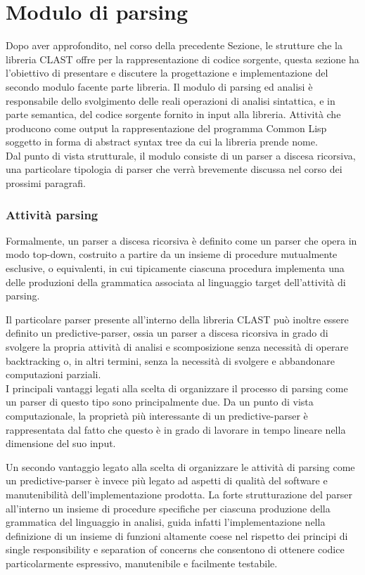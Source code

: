 \section{Modulo di parsing}
\label{parsing}

Dopo aver approfondito, nel corso della precedente Sezione, le strutture che
la libreria CLAST offre per la rappresentazione di codice sorgente, questa
sezione ha l’obiettivo di presentare e discutere la progettazione e
implementazione del secondo modulo facente parte libreria. Il modulo di
parsing ed analisi è responsabile dello svolgimento delle reali operazioni di
analisi sintattica, e in parte semantica, del codice sorgente fornito in input
alla libreria. Attività che producono come output la rappresentazione del
programma Common Lisp soggetto in forma di abstract syntax tree da cui la
libreria prende nome.\\

Dal punto di vista strutturale, il modulo consiste di un parser a discesa
ricorsiva, una particolare tipologia di parser che verrà brevemente discussa
nel corso dei prossimi paragrafi.

\subsubsection{Attività parsing}

Formalmente, un parser a discesa ricorsiva è definito come un parser che opera
in modo top-down, costruito a partire da un insieme di procedure mutualmente
esclusive, o equivalenti, in cui tipicamente ciascuna procedura implementa una
delle produzioni della grammatica associata al linguaggio target dell’attività
di parsing.

Il particolare parser presente all’interno della libreria CLAST può inoltre
essere definito un predictive-parser, ossia un parser a discesa ricorsiva in
grado di svolgere la propria attività di analisi e scomposizione senza
necessità di operare backtracking o, in altri termini, senza la necessità di
svolgere e abbandonare computazioni parziali.\\

I principali vantaggi legati alla scelta di organizzare il processo di parsing
come un parser di questo tipo sono principalmente due. Da un punto di vista
computazionale, la proprietà più interessante di un predictive-parser è
rappresentata dal fatto che questo è in grado di lavorare in tempo lineare
nella dimensione del suo input.

Un secondo vantaggio legato alla scelta di organizzare le attività di parsing
come un predictive-parser è invece più legato ad aspetti di qualità del
software e manutenibilità dell’implementazione prodotta. La forte
strutturazione del parser all'interno un insieme di procedure specifiche per
ciascuna produzione della grammatica del linguaggio in analisi, guida infatti
l’implementazione nella definizione di un insieme di funzioni altamente coese
nel rispetto dei principi di single responsibility e separation of concerns
che consentono di ottenere codice particolarmente espressivo, manutenibile e
facilmente testabile.\\

